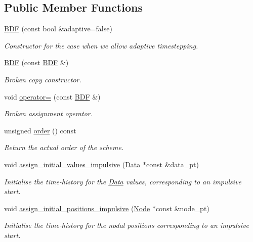 \subsection*{Public Member Functions}
\begin{DoxyCompactItemize}
\item 
\hyperlink{classoomph_1_1BDF_a52ac633248d5603926b3e74559607d07}{B\+DF} (const bool \&adaptive=false)
\begin{DoxyCompactList}\small\item\em Constructor for the case when we allow adaptive timestepping. \end{DoxyCompactList}\item 
\hyperlink{classoomph_1_1BDF_a066a1758fbdf26feb1305795f4b19417}{B\+DF} (const \hyperlink{classoomph_1_1BDF}{B\+DF} \&)
\begin{DoxyCompactList}\small\item\em Broken copy constructor. \end{DoxyCompactList}\item 
void \hyperlink{classoomph_1_1BDF_aa9061eca9649de9fee2567b882b258ce}{operator=} (const \hyperlink{classoomph_1_1BDF}{B\+DF} \&)
\begin{DoxyCompactList}\small\item\em Broken assignment operator. \end{DoxyCompactList}\item 
unsigned \hyperlink{classoomph_1_1BDF_a778cd01f9e0e8047d5838f6283512131}{order} () const
\begin{DoxyCompactList}\small\item\em Return the actual order of the scheme. \end{DoxyCompactList}\item 
void \hyperlink{classoomph_1_1BDF_a569e571e8f96382bfa9cecd7abb05af4}{assign\+\_\+initial\+\_\+values\+\_\+impulsive} (\hyperlink{classoomph_1_1Data}{Data} $\ast$const \&data\+\_\+pt)
\begin{DoxyCompactList}\small\item\em Initialise the time-\/history for the \hyperlink{classoomph_1_1Data}{Data} values, corresponding to an impulsive start. \end{DoxyCompactList}\item 
void \hyperlink{classoomph_1_1BDF_a2506824a840f47d5d816b68f6144c7e7}{assign\+\_\+initial\+\_\+positions\+\_\+impulsive} (\hyperlink{classoomph_1_1Node}{Node} $\ast$const \&node\+\_\+pt)
\begin{DoxyCompactList}\small\item\em Initialise the time-\/history for the nodal positions corresponding to an impulsive start. \end{DoxyCompactList}\item 

\end{DoxyCompactItemize}
